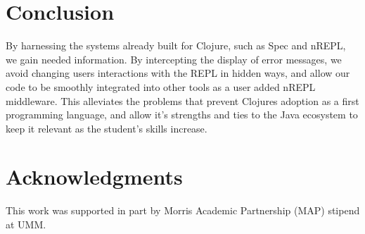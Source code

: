 \documentclass[12pt]{article}
\begin{document}
\section{Conclusion}
By harnessing the systems already built for Clojure,
such as Spec and nREPL, we gain needed information.
By intercepting the display of error messages, we avoid changing users
interactions with the REPL in hidden ways, and allow our code to
be smoothly integrated into other tools as a user added nREPL middleware.
  This alleviates the problems that prevent Clojures
 adoption as a first programming language, and allow it's strengths
 and ties to the Java ecosystem to keep it relevant as the student's skills increase.
 




\section{Acknowledgments}
This work was supported in part by Morris Academic Partnership (MAP) stipend at UMM.




\end{document}
